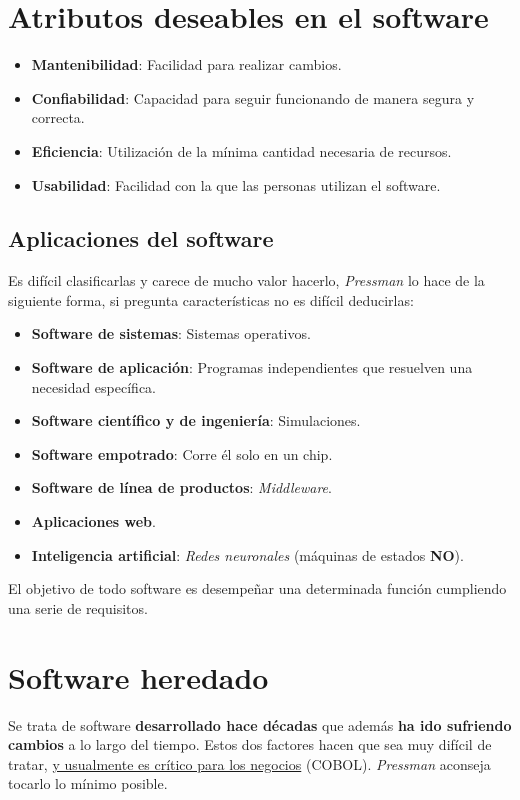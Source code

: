 \section{Atributos deseables en el software}
\begin{itemize}
    \item \textbf{Mantenibilidad}: Facilidad para realizar cambios.
    \item \textbf{Confiabilidad}: Capacidad para seguir funcionando de manera segura y correcta.
    \item \textbf{Eficiencia}: Utilización de la mínima cantidad necesaria de recursos.
    \item \textbf{Usabilidad}: Facilidad con la que las personas utilizan el software.
\end{itemize}

\subsection{Aplicaciones del software}
Es difícil clasificarlas y carece de mucho valor hacerlo, \textit{Pressman} lo hace de la siguiente forma, si pregunta características no es difícil deducirlas:
\begin{itemize}
    \item \textbf{Software de sistemas}: Sistemas operativos.
    \item \textbf{Software de aplicación}: Programas independientes que resuelven una necesidad específica.
    \item \textbf{Software científico y de ingeniería}: Simulaciones.
    \item \textbf{Software empotrado}: Corre él solo en un chip.
    \item \textbf{Software de línea de productos}: \textit{Middleware}.
    \item \textbf{Aplicaciones web}.
    \item \textbf{Inteligencia artificial}: \textit{Redes neuronales} (máquinas de estados \textbf{NO}).
\end{itemize}
El objetivo de todo software es desempeñar una determinada función cumpliendo una serie de requisitos.

\section{Software heredado}
Se trata de software \textbf{desarrollado hace décadas} %
que además \textbf{ha ido sufriendo cambios} a lo largo del tiempo. Estos dos factores hacen que sea muy difícil de tratar, \uline{y usualmente es crítico para los negocios} (COBOL). \textit{Pressman} aconseja tocarlo lo mínimo posible.

